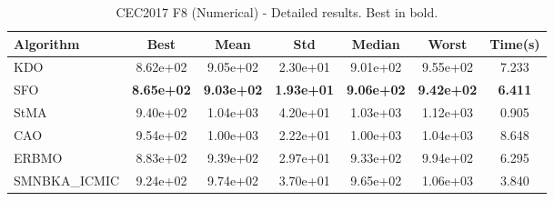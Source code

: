 \begin{table}[H]
\centering\small
\caption{CEC2017 F8 (Numerical) - Detailed results. Best in bold.}
\label{tab:cec2017_F8}
\begin{tabular}{lcccccc}
\toprule
\textbf{Algorithm} & \textbf{Best} & \textbf{Mean} & \textbf{Std} & \textbf{Median} & \textbf{Worst} & \textbf{Time(s)} \\
\midrule
KDO & 8.62e+02 & 9.05e+02 & 2.30e+01 & 9.01e+02 & 9.55e+02 & 7.233 \\
SFO & \textbf{8.65e+02} & \textbf{9.03e+02} & \textbf{1.93e+01} & \textbf{9.06e+02} & \textbf{9.42e+02} & \textbf{6.411} \\
StMA & 9.40e+02 & 1.04e+03 & 4.20e+01 & 1.03e+03 & 1.12e+03 & 0.905 \\
CAO & 9.54e+02 & 1.00e+03 & 2.22e+01 & 1.00e+03 & 1.04e+03 & 8.648 \\
ERBMO & 8.83e+02 & 9.39e+02 & 2.97e+01 & 9.33e+02 & 9.94e+02 & 6.295 \\
SMNBKA_ICMIC & 9.24e+02 & 9.74e+02 & 3.70e+01 & 9.65e+02 & 1.06e+03 & 3.840 \\
\bottomrule
\end{tabular}
\end{table}
